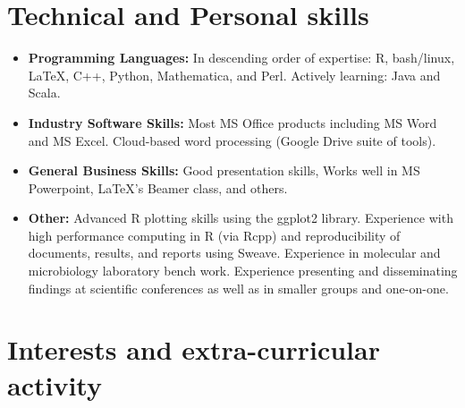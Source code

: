 \documentclass[11pt,a4paper,sans]{moderncv}        %
\begin{document}
\section{Technical and Personal skills}

\vspace{6pt}

\begin{itemize}

\item \textbf{Programming Languages:} In descending order of expertise: R, bash/linux, \LaTeX, C++, Python, Mathematica, and Perl. Actively learning: Java and Scala. 

\vspace{6pt}

\item \textbf{Industry Software Skills:} Most MS Office products including MS Word and MS Excel. Cloud-based word processing (Google Drive suite of tools).

\vspace{6pt}

\item \textbf{General Business Skills:} Good presentation skills, Works well in MS Powerpoint, \LaTeX's Beamer class, and others. 

\vspace{6pt}

\item \textbf{Other:} Advanced R plotting skills using the ggplot2 library. Experience with high performance computing in R (via Rcpp) and reproducibility of documents, results, and reports using Sweave.  Experience in molecular and microbiology laboratory bench work. Experience presenting and disseminating findings at scientific conferences as well as in smaller groups and one-on-one. 

\end{itemize}

\section{Interests and extra-curricular activity}

\vspace{6pt}
\end{document}
